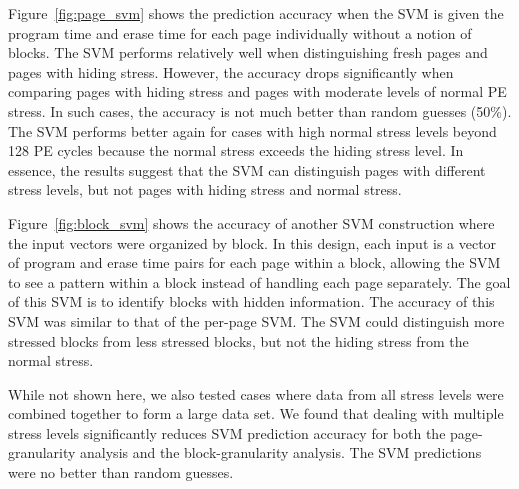 Figure~\ref{fig:page_svm} shows the prediction accuracy when the SVM is given
the program time and erase time for each page individually without a notion of
blocks.
The SVM performs relatively well when distinguishing fresh pages and pages
with hiding stress.
However, the accuracy drops significantly when comparing pages with hiding stress
and pages with moderate levels of normal PE stress. In such cases, the accuracy
is not much better than random guesses (50\%).
The SVM performs better again for cases with high normal stress levels beyond 
128 PE cycles because the normal stress exceeds the hiding stress level.
In essence, the results suggest that the SVM can distinguish pages with different
stress levels, but not pages with hiding stress and normal stress.

Figure~\ref{fig:block_svm} shows the accuracy of another SVM construction
where the input vectors were organized by block. In this design, each input 
is a vector of program and erase time pairs for each page within a block, 
allowing the SVM to see a pattern within a block instead of handling each
page separately. The goal of this SVM is to identify blocks with hidden
information. The accuracy of this SVM was similar to that of the 
per-page SVM. The SVM could distinguish more stressed blocks from less stressed
blocks, but not the hiding stress from the normal stress.

While not shown here, we also tested cases where data from all stress levels
were combined together to form a large data set. We found that dealing with
multiple stress levels significantly reduces SVM prediction accuracy for
both the page-granularity analysis and the block-granularity analysis.
The SVM predictions were no better than random guesses.





